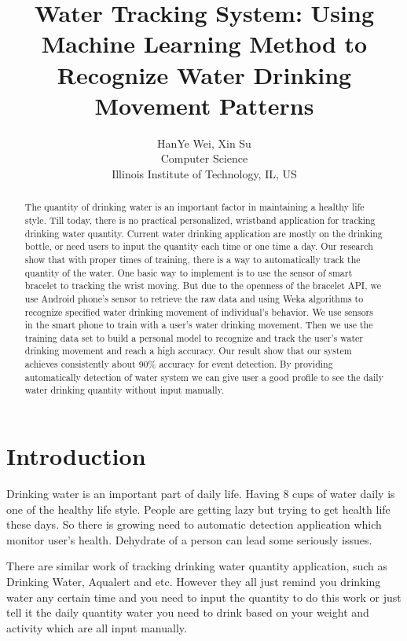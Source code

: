 \documentclass[12pt,twocolumn]{article}
\title{Water Tracking System: Using Machine Learning Method to Recognize Water Drinking Movement Patterns}
\author{HanYe Wei, Xin Su\\
Computer Science\\
Illinois Institute of Technology, IL, US}
\date{}
\begin{document}
\maketitle

\begin{abstract}
The quantity of drinking water is an important factor in maintaining a healthy life style. Till today, there is no practical personalized, wristband application for tracking drinking water quantity. Current water drinking application are mostly on the drinking bottle, or need users to input the quantity each time or one time a day. Our research show that with proper times of training, there is a way to automatically track the quantity of the water. One basic way to implement is to use the sensor of smart bracelet to tracking the wrist moving. But due to the openness of the bracelet API, we use Android phone's sensor to retrieve the raw data and using Weka algorithms to recognize specified water drinking movement of individual's behavior. We use sensors in the smart phone to train with a user's water drinking movement. Then we use the training data set to build a personal model to recognize and track the user's water drinking movement  and reach a high accuracy. Our result show that our system achieves consistently about 90\% accuracy for event detection. By providing automatically detection of water system we can give user a good profile to see the daily water drinking quantity without input manually\cite{Thomas}.
\end{abstract}

\section{Introduction}
Drinking water is an important part of daily life. Having 8 cups of water daily is one of the healthy life style. People are getting lazy but trying to get health life these days. So there is growing need to automatic detection application which monitor user's health. Dehydrate of a person can lead some seriously issues\cite{Thomas}.

There are similar work of tracking drinking water quantity application, such as Drinking Water\cite{Chickpin}, Aqualert\cite{Aqualert} and etc. However they all just remind you drinking water any certain time and you need to input the quantity to do this work or just tell it the daily quantity water you need to drink based on your weight and activity which are all input manually.
\end{document}
